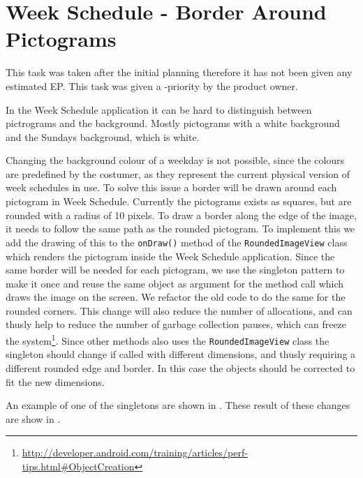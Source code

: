 \section{Week Schedule - Border Around Pictograms}
This task was taken after the initial planning therefore it has not been given any estimated EP. 
This task was given a \phigh-priority by the product owner. 

In the Week Schedule application it can be hard to distinguish between pictrograms and the background.
Mostly pictograms with a white background and the Sundays background, which is white.

Changing the background colour of a weekday is not possible, since the colours are predefined by the costumer, as they represent the current physical version of week schedules in use.
To solve this issue a border will be drawn around each pictogram in Week Schedule.
Currently the pictograms exists as squares, but are rounded with a radius of 10 pixels.
To draw a border along the edge of the image, it needs to follow the same path as the rounded pictogram. 
To implement this we add the drawing of this to the \texttt{onDraw()} method of the \texttt{RoundedImageView} class which renders the pictogram inside the Week Schedule application. 
Since the same border will be needed for each pictogram, we use the singleton pattern to make it once and reuse the same object as argument for the method call which draws the image on the screen. 
We refactor the old code to do the same for the rounded corners. 
This change will also reduce the number of allocations, and can thusly help to reduce the number of garbage collection pauses, which can freeze the system\footnote{\url{http://developer.android.com/training/articles/perf-tips.html\#ObjectCreation}}. 
Since other methods also uses the \texttt{RoundedImageView} class the singleton should change if called with different dimensions, and thusly requiring a different rounded edge and border. 
In this case the objects should be corrected to fit the new dimensions. 

An example of one of the singletons are shown in .
These result of these changes are show in . 

